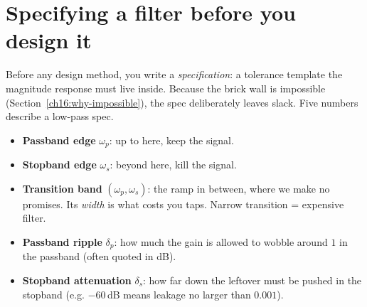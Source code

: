 \section{Specifying a filter before you design it}
\label{ch16:spec}

Before any design method, you write a
\emph{specification}: a tolerance template the magnitude response must live inside.
Because the brick wall is impossible (Section~\ref{ch16:why-impossible}), the spec
deliberately leaves slack. Five numbers describe a low-pass spec.

\begin{itemize}
\item \textbf{Passband edge} $\omega_p$: up to here, keep the signal.
\item \textbf{Stopband edge} $\omega_s$: beyond here, kill the signal.
\item \textbf{Transition band} $(\omega_p, \omega_s)$: the ramp in between, where
we make no promises. Its \emph{width} is what costs you taps. Narrow transition =
expensive filter.
\item \textbf{Passband ripple} $\delta_p$: how much the gain is allowed to wobble
around $1$ in the passband (often quoted in dB).
\item \textbf{Stopband attenuation} $\delta_s$: how far down the leftover must be
pushed in the stopband (e.g. $-60$\,dB means leakage no larger than $0.001$).
\end{itemize}

